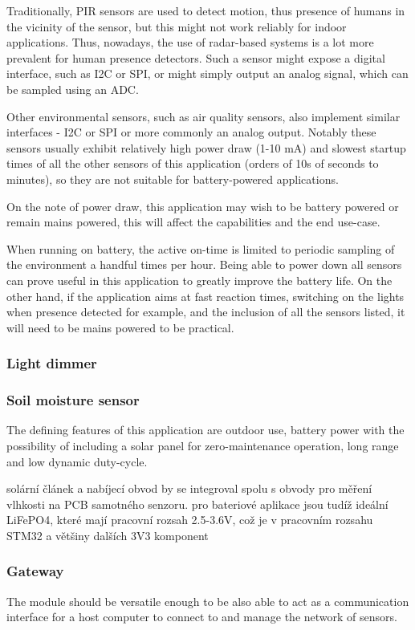 Traditionally, PIR sensors are used to detect motion, thus presence of humans in the vicinity of the sensor, but this might not work reliably for indoor applications. Thus, nowadays, the use of radar-based systems is a lot more prevalent for human presence detectors. Such a sensor might expose a digital interface, such as I2C or SPI, or might simply output an analog signal, which can be sampled using an ADC.

Other environmental sensors, such as air quality sensors, also implement similar interfaces - I2C or SPI or more commonly an analog output. Notably these sensors usually exhibit relatively high power draw (1-10 mA) and slowest startup times of all the other sensors of this application (orders of 10s of seconds to minutes), so they are not suitable for battery-powered applications.

On the note of power draw, this application may wish to be battery powered or remain mains powered, this will affect the capabilities and the end use-case. 

When running on battery, the active on-time is limited to periodic sampling of the environment a handful times per hour. Being able to power down all sensors can prove useful in this application to greatly improve the battery life. On the other hand, if the application aims at fast reaction times, switching on the lights when presence detected for example, and the inclusion of all the sensors listed, it will need to be mains powered to be practical.

\subsubsection{Light dimmer}

\subsubsection{Soil moisture sensor}
The defining features of this application are outdoor use, battery power with the possibility of including a solar panel for zero-maintenance operation, long range and low dynamic duty-cycle.

solární článek a nabíjecí obvod by se integroval spolu s obvody pro měření vlhkosti na PCB samotného senzoru. pro bateriové aplikace jsou tudíž ideální LiFePO4, které mají pracovní rozsah 2.5-3.6V, což je v pracovním rozsahu STM32 a většiny dalších 3V3 komponent

\subsubsection{Gateway}
The module should be versatile enough to be also able to act as a communication interface for a host computer to connect to and manage the network of sensors.

